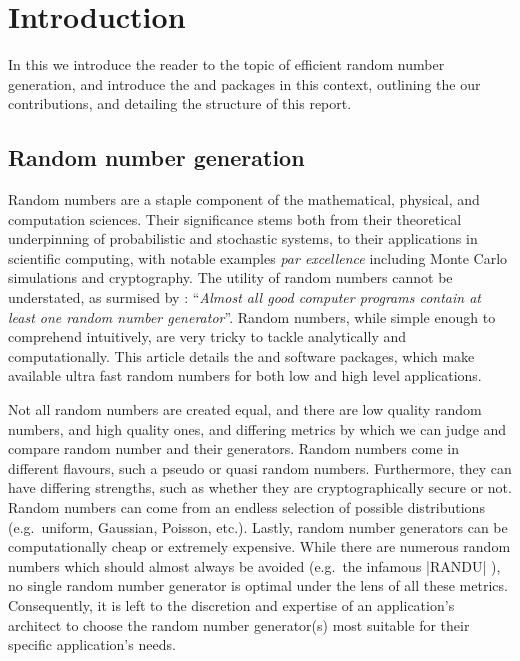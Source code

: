 \section{Introduction}
\label{sec:introduction}

In this  we introduce the reader to the topic of efficient random number generation, and introduce the \arv and \pyarv packages in this context, outlining the our contributions, and detailing the structure of this report.

\subsection{Random number generation}

Random numbers are a staple component of the mathematical, physical, and computation sciences. Their significance stems both from their theoretical underpinning of probabilistic and stochastic systems, to their applications in scientific computing, with notable examples \textit{par excellence} including Monte Carlo simulations and cryptography. The utility of random numbers cannot be understated, as surmised by \citet[p.\,189]{knuth2019art_semi}: ``\textit{Almost all good computer programs contain at least one random number generator}''. Random numbers, while simple enough to comprehend intuitively, are very tricky to tackle analytically and computationally. This article details the \arv and \pyarv software packages, which make available ultra fast random numbers for both low and high level applications. 

Not all random numbers are created equal, and there are low quality random numbers, and high quality ones, and differing metrics by which we can judge and compare random number and their generators. Random numbers come in different flavours, such a pseudo or quasi random numbers. Furthermore, they can have differing strengths, such as whether they are cryptographically secure or not. Random numbers can come from an endless selection of possible distributions (e.g.\ uniform, Gaussian, Poisson, etc.). Lastly, random number generators can be computationally cheap or extremely expensive. While there are numerous random numbers which should almost always be avoided (e.g.\ the infamous \inlinec|RANDU| \citep[p.\,107, 188]{knuth2019art_semi}), no single random number generator is optimal under the lens of all these metrics. Consequently, it is left to the discretion and expertise of an application's architect to choose the random number generator(s) most suitable for their specific application's needs. 

